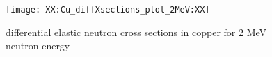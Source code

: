 
\begin{figure}[h]
\centering
	\texttt{[image: XX:Cu\_diffXsections\_plot\_2MeV:XX]}
	\caption[diff. neutron cross sections (2 MeV)]{differential elastic neutron cross sections in copper for 2 MeV neutron energy}
	\label{fig:CuNeutronDiffXsectionplot2MeV}
\end{figure}

